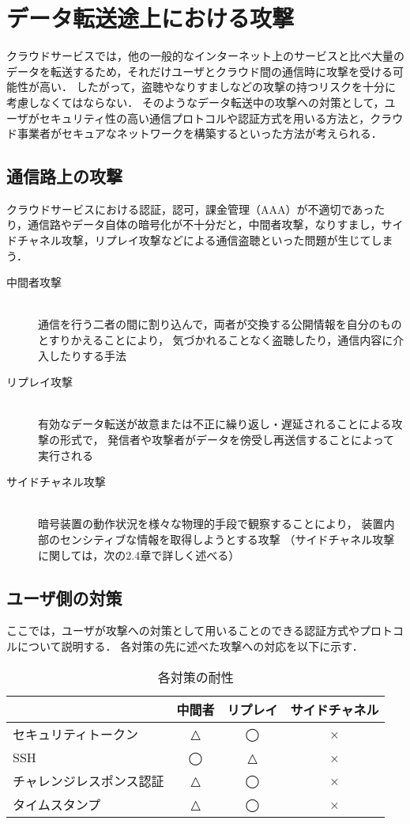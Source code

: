 \section{データ転送途上における攻撃}
クラウドサービスでは，他の一般的なインターネット上のサービスと比べ大量のデータを転送するため，それだけユーザとクラウド間の通信時に攻撃を受ける可能性が高い．
したがって，盗聴やなりすましなどの攻撃の持つリスクを十分に考慮しなくてはならない．
そのようなデータ転送中の攻撃への対策として，ユーザがセキュリティ性の高い通信プロトコルや認証方式を用いる方法と，クラウド事業者がセキュアなネットワークを構築するといった方法が考えられる．

\subsection{通信路上の攻撃}
クラウドサービスにおける認証，認可，課金管理（AAA）が不適切であったり，通信路やデータ自体の暗号化が不十分だと，中間者攻撃，なりすまし，サイドチャネル攻撃，リプレイ攻撃などによる通信盗聴といった問題が生じてしまう．

\begin{description}
	\item[中間者攻撃]\mbox{}\\ 
		通信を行う二者の間に割り込んで，両者が交換する公開情報を自分のものとすりかえることにより，
		気づかれることなく盗聴したり，通信内容に介入したりする手法	
	
	\item[リプレイ攻撃]\mbox{}\\
		有効なデータ転送が故意または不正に繰り返し・遅延されることによる攻撃の形式で，
		発信者や攻撃者がデータを傍受し再送信することによって実行される

	\item[サイドチャネル攻撃]\mbox{}\\
		暗号装置の動作状況を様々な物理的手段で観察することにより，
		装置内部のセンシティブな情報を取得しようとする攻撃
		（サイドチャネル攻撃に関しては，次の2.4章で詳しく述べる）
\end{description}

\subsection{ユーザ側の対策}
ここでは，ユーザが攻撃への対策として用いることのできる認証方式やプロトコルについて説明する．
各対策の先に述べた攻撃への対応を以下に示す．

\begin{table}[t]
\caption{各対策の耐性}
\label{tb:netmodel}
\begin{center}
\begin{tabular}{|l|c|c|c|}
\hline
　& 中間者 & リプレイ & サイドチャネル \\ \hline
セキュリティトークン & △ & ◯ & × \\ \hline
SSH & ◯ & △ & × \\ \hline
チャレンジレスポンス認証 & △ & ◯ & × \\ \hline
タイムスタンプ & △ & ◯ & × \\
\hline
\end{tabular}
\end{center}
\end{table}

